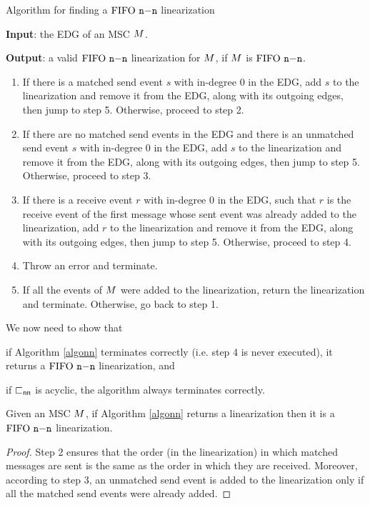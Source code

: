 \begin{algorithm}[t]
\caption{Algorithm for finding a $\text{FIFO } \mathtt{n\mathsf{-}n}$ linearization}
\label{algonn}
\raggedright \textbf{Input}: the EDG of an MSC $M$. \\
\raggedright \textbf{Output}: a valid $\text{FIFO } \mathtt{n\mathsf{-}n}$ linearization for $M$, if $M$ is $\text{FIFO } \mathtt{n\mathsf{-}n}$.
\begin{enumerate}
	\item If there is a matched send event $s$ with in-degree 0 in the EDG, add $s$ to the linearization and remove it from the EDG, along with its outgoing edges, then jump to step 5. Otherwise, proceed to step 2.
	\item If there are no matched send events in the EDG and there is an unmatched send event $s$ with in-degree 0 in the EDG, add $s$ to the linearization and remove it from the EDG, along with its outgoing edges, then jump to step 5. Otherwise, proceed to step 3.
		\item If there is a receive event $r$ with in-degree 0 in the EDG, such that $r$ is the receive event of the first message whose sent event was already added to the linearization, add $r$ to the linearization and remove it from the EDG, along with its outgoing edges, then jump to step 5. Otherwise, proceed to step 4.
		\item Throw an error and terminate.
		\item If all the events of $M$ were added to the linearization, return the linearization and terminate. Otherwise, go back to step 1.
\end{enumerate} 
\end{algorithm}



We now need to show that 
\begin{enumerate*}[label={(\roman*)}]
	\item if Algorithm \ref{algonn} terminates correctly (i.e. step 4 is never executed), it returns a $\text{FIFO } \mathtt{n\mathsf{-}n}$ linearization, and 
	\item if $\sqsubset_{\mathsf{nn}}$ is acyclic, the algorithm always terminates correctly.
\end{enumerate*}

\begin{proposition}
	Given an MSC $M$, if Algorithm \ref{algonn} returns a linearization then  it is a $\text{FIFO } \mathtt{n\mathsf{-}n}$ linearization.
\end{proposition}
\begin{proof}
	Step 2 ensures that the order (in the linearization) in which matched messages are sent is the same as the order in which they are received. Moreover, according to step 3, an unmatched send event is added to the linearization only if all the matched send events were already added.
\end{proof}



